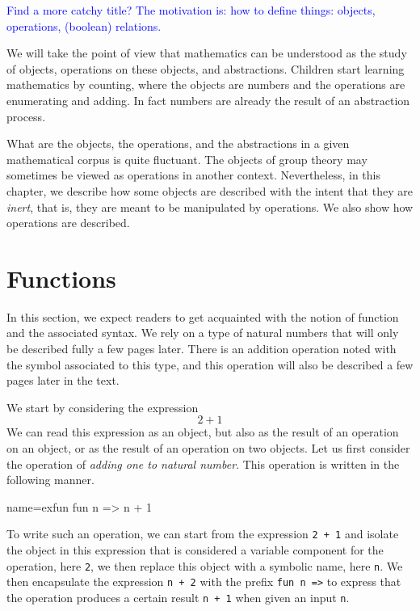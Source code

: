 \label{ch:prog}

\textcolor{blue}{Find a more catchy title? The motivation is: how to define things:
objects, operations, (boolean) relations.}

We will take the point of view that mathematics can be understood as
the study of objects, operations on these objects, and abstractions.  
Children start learning mathematics by counting, where the objects are
numbers and the operations are enumerating and adding.  In fact
numbers are already the result of an abstraction process.

What are the objects, the operations, and the abstractions in a given
mathematical corpus is quite fluctuant.  The objects of group theory
may sometimes be viewed as operations in another context.  Nevertheless,
in this chapter, we describe how some objects are described with the intent
that they are {\em inert}, that is, they are meant to be
manipulated by operations.  We also show how operations are described.

\section{Functions}
In this section, we expect readers to get acquainted with the notion
of function and the associated syntax.  We rely on a type of natural
numbers that will only be described fully a few pages later.  There is an
addition operation noted with the \C{+} symbol associated to this
type, and this operation will also be described  a few pages later in
the text.

We start by considering the expression
\[ 2 + 1 \]
We can read this expression as an object, but also as the result of an
operation on an object, or as the result of an operation on two
objects.  Let us first consider the operation of {\em adding one to
  natural number}.  This operation is written in the following manner.

\begin{coq}{name=exfun}{}
  fun n => n + 1
\end{coq}
To write such an operation, we can start from the expression {\tt 2 +
  1} and isolate the object in this expression that is considered a
variable component for the operation, here {\tt 2}, we then replace
this object with a symbolic name, here {\tt n}.  We then encapsulate
the expression {\tt n + 2} with the prefix {\tt fun n =>} to express
that the operation produces a certain result {\tt n + 1} when given an
input {\tt n}.

